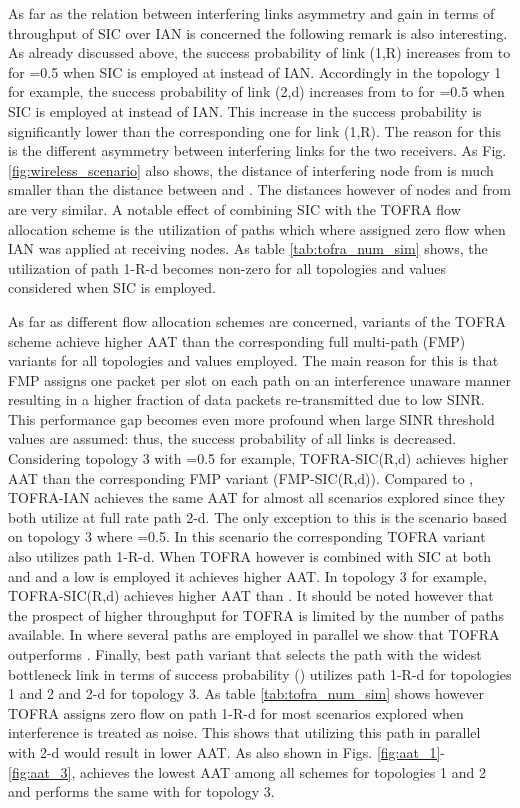 \documentclass[conference]{IEEEtran}
\begin{document}
As far as the relation between interfering links asymmetry and gain in terms of throughput of SIC over IAN is concerned the following remark is also
interesting. As already discussed above, the success probability of link (1,R) increases from  to  for =0.5
when SIC is employed at  instead of IAN. Accordingly in the topology 1 for example, the success probability
of link (2,d) increases from  to  for =0.5 when SIC is employed at  instead of IAN. This increase in the success probability
is significantly lower than the corresponding one for link (1,R). The reason for this is the different asymmetry between interfering links for the two receivers.
As Fig. \ref{fig:wireless_scenario} also shows, the distance of interfering node  from  is much smaller than
the distance between  and . The distances however of nodes  and  from  are very similar.
A notable effect of combining SIC with the TOFRA flow allocation scheme is the utilization of paths which where assigned zero flow when IAN was
applied at receiving nodes. As table \ref{tab:tofra_num_sim} shows, the utilization of path 1-R-d becomes non-zero for all topologies and  
values considered when SIC is employed.

As far as different flow allocation schemes are concerned, variants of the TOFRA scheme achieve  higher AAT than the
corresponding full multi-path (FMP) variants for all topologies and  values employed. The main reason
for this is that FMP assigns one packet per slot on each path on an interference unaware manner resulting in a higher fraction of data packets
re-transmitted due to low SINR. This performance gap becomes even more profound when large SINR threshold values are assumed: thus,
the success probability of all links is decreased. Considering topology 3 with =0.5 for example, TOFRA-SIC(R,d) achieves  higher
AAT than the corresponding FMP variant (FMP-SIC(R,d)).
Compared to , TOFRA-IAN achieves the same AAT for almost all scenarios explored since they both utilize at full rate path 2-d.
The only exception to this is the scenario based on topology 3 where =0.5. In this scenario the corresponding TOFRA variant also utilizes
path 1-R-d.
When TOFRA however is combined with SIC at both 
and  and a low  is employed it achieves higher AAT. In topology 3 for example, TOFRA-SIC(R,d) achieves  higher AAT than .
It should be noted however that the prospect of higher throughput for TOFRA is limited by the number of paths available. In \cite{DBLP:journals/corr/PloumidisPT14}
where several paths are employed in parallel we show that TOFRA outperforms .
Finally, best path variant that selects the path with the widest bottleneck link in terms of success probability () utilizes path 1-R-d for topologies 1 and 2
and 2-d for topology 3. As table \ref{tab:tofra_num_sim} shows however TOFRA assigns zero flow on path 1-R-d for most scenarios explored when interference is treated as noise.
This shows that utilizing this path in parallel with 2-d would result in lower AAT.
As also shown in Figs. \ref{fig:aat_1}-\ref{fig:aat_3},  achieves the lowest AAT among all schemes for topologies 1 and 2 and performs the same with
 for topology 3.
\end{document}
